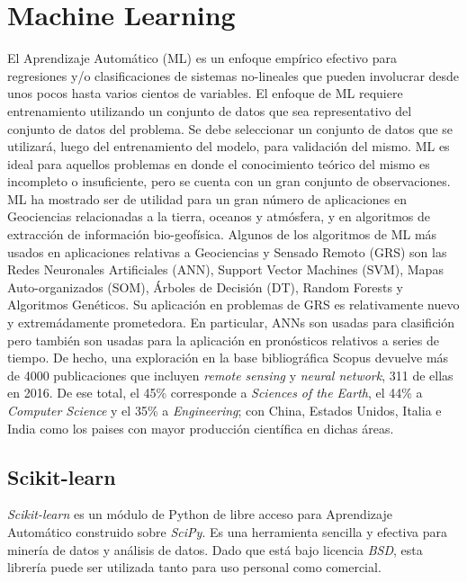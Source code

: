 


\justifying

\section{Machine Learning}

El Aprendizaje Automático (ML) es un enfoque empírico efectivo para
regresiones y/o clasificaciones de sistemas no-lineales que pueden involucrar desde
unos pocos hasta varios cientos de variables. El enfoque de ML requiere
entrenamiento utilizando un conjunto de datos que sea representativo del conjunto
de datos del problema. Se debe seleccionar un conjunto de datos que se utilizará,
luego del entrenamiento del modelo, para validación del mismo.
ML es ideal para aquellos problemas en donde el conocimiento teórico del mismo
es incompleto o insuficiente, pero se cuenta con un gran conjunto de observaciones.
ML ha mostrado ser de utilidad para un gran número de aplicaciones en Geociencias
relacionadas a la tierra, oceanos y atmósfera, y en algoritmos de extracción
de información bio-geofísica.
Algunos de los algoritmos de ML más usados en aplicaciones relativas a
Geociencias y Sensado Remoto (GRS) son las Redes Neuronales Artificiales (ANN),
Support Vector Machines (SVM), Mapas Auto-organizados (SOM), Árboles de Decisión (DT),
Random Forests y Algoritmos Genéticos. Su aplicación en problemas de GRS es
relativamente nuevo y extremádamente prometedora. En particular, ANNs son
usadas para clasifición pero también son usadas para la aplicación en pronósticos
relativos a series de tiempo.
De hecho, una exploración en la base bibliográfica Scopus devuelve más de 4000
publicaciones que incluyen \textit{remote sensing} y \textit{neural network},
311 de ellas en 2016. De ese total, el 45\% corresponde a
\textit{Sciences of the Earth}, el 44\% a \textit{Computer Science} y el 35\% a
\textit{Engineering}; con China, Estados Unidos, Italia e India como los paises
con mayor producción científica en dichas áreas.


\subsection{Scikit-learn}

  \par \textit{Scikit-learn}\cite{scikit-learn, sklearn_review} es un módulo
    de Python de libre acceso para Aprendizaje Automático
    construido sobre \textit{SciPy}\cite{scipy}. Es una herramienta
    sencilla y efectiva para minería de datos y análisis de datos. Dado que está bajo
    licencia \textit{BSD}, esta librería puede ser utilizada tanto
    para uso personal como comercial.

